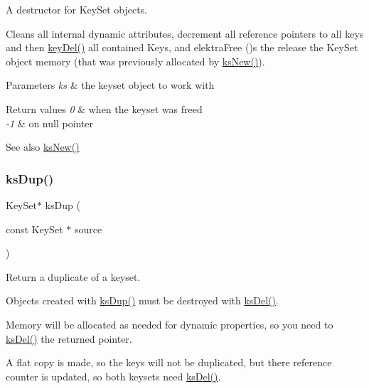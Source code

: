 A destructor for Key\+Set objects. 

Cleans all internal dynamic attributes, decrement all reference pointers to all keys and then \hyperlink{group__key_ga3df95bbc2494e3e6703ece5639be5bb1}{key\+Del()} all contained Keys, and elektra\+Free ()s the release the Key\+Set object memory (that was previously allocated by \hyperlink{group__keyset_ga671e1aaee3ae9dc13b4834a4ddbd2c3c}{ks\+New()}).


\begin{DoxyParams}{Parameters}
{\em ks} & the keyset object to work with \\
\hline
\end{DoxyParams}

\begin{DoxyRetVals}{Return values}
{\em 0} & when the keyset was freed \\
\hline
{\em -\/1} & on null pointer \\
\hline
\end{DoxyRetVals}
\begin{DoxySeeAlso}{See also}
\hyperlink{group__keyset_ga671e1aaee3ae9dc13b4834a4ddbd2c3c}{ks\+New()} 
\end{DoxySeeAlso}
\mbox{\label{group__keyset_gac59e4b328245463f1451f68d5106151c}} 
\subsubsection{\texorpdfstring{ks\+Dup()}{ksDup()}}
{\footnotesize\ttfamily Key\+Set$\ast$ ks\+Dup (\begin{DoxyParamCaption}\item[{const Key\+Set $\ast$}]{source }\end{DoxyParamCaption})}



Return a duplicate of a keyset. 

Objects created with \hyperlink{group__keyset_gac59e4b328245463f1451f68d5106151c}{ks\+Dup()} must be destroyed with \hyperlink{group__keyset_ga27e5c16473b02a422238c8d970db7ac8}{ks\+Del()}.

Memory will be allocated as needed for dynamic properties, so you need to \hyperlink{group__keyset_ga27e5c16473b02a422238c8d970db7ac8}{ks\+Del()} the returned pointer.

A flat copy is made, so the keys will not be duplicated, but there reference counter is updated, so both keysets need \hyperlink{group__keyset_ga27e5c16473b02a422238c8d970db7ac8}{ks\+Del()}.


